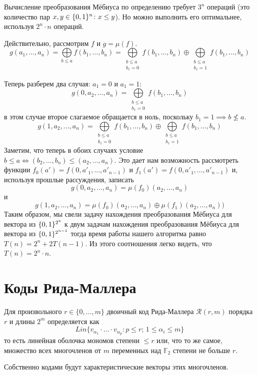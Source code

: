 Вычисление преобразования Мёбиуса по определению требует $3^n$ операций
(это количество пар $x, y \in \{0,1\}^n \colon x \le y$). Но можно выполнить
его оптимальнее, используя $2^n \cdot n$ операций.

Действительно, рассмотрим $f$ и $g = \mu(f)$. 
$$g(a_1, \ldots, a_n) = \bigoplus\limits_{b \le a} f(b_1, \ldots, b_n) = 
\bigoplus\limits_{\substack{b \le a \\ b_1 = 0}} f(b_1, \ldots, b_n) \oplus
\bigoplus\limits_{\substack{b \le a \\ b_1 = 1}} f(b_1, \ldots, b_n)$$

Теперь разберем два случая: $a_1 = 0$ и $a_1 = 1$:
$$g(0, a_2, \ldots, a_n) = \bigoplus\limits_{\substack{b \le a \\ b_1 = 0}} f(b_1, \ldots, b_n)$$
в этом случае второе слагаемое обращается в ноль, поскольку 
$b_1 = 1 \implies b \not\le a$.
$$g(1, a_2, \ldots, a_n) = 
\bigoplus\limits_{\substack{b \le a \\ b_1 = 0}} f(b_1, \ldots, b_n) \oplus
\bigoplus\limits_{\substack{b \le a \\ b_1 = 1}} f(b_1, \ldots, b_n)$$
Заметим, что теперь в обоих случаях условие 
$b \le a \iff (b_2, \ldots, b_n) \le (a_2, \ldots, a_n)$. Это дает нам
возможность рассмотреть функции $f_0 (a') = f(0, a'_1, \ldots, a'_{n-1})$
и $f_1(a') = f(0, a'_1, \ldots, a'_{n-1})$ и, используя прошлые рассуждения,
записать
$$g(0, a_2, \ldots, a_n) = \mu(f_0) (a_2, \ldots, a_n)$$
и 
$$g(1, a_2, \ldots, a_n) = \mu(f_0) (a_2, \ldots, a_n) \oplus
                           \mu(f_1) (a_2, \ldots, a_n))$$
Таким образом, мы свели задачу нахождения преобразования
Мёбиуса для вектора из $\{0,1\}^{2^n}$ к двум задачам нахождения преобразования
Мёбиуса для вектора из $\{0,1\}^{2^{n-1}}$ тогда время работы нашего
алгоритма равно $T(n) = 2^n + 2T(n-1)$. Из этого соотношения легко
видеть, что $T(n) = 2^n \cdot n$.      

\section{Коды Рида-Маллера}                    
                               

\begin{definition}
Для произвольного $r \in \{0, \ldots, m\}$ двоичный код Рида-Маллера $\mathscr{R}(r,m)$ 
порядка $r$ и длины $2^m$ определяется как 
    $$Lin \{v_{\alpha_1} \cdot \ldots \cdot v_{\alpha_p} \colon p \le r; \, 1 \le \alpha_i \le m\}$$
то есть линейная оболочка мономов степени $\le r$ или, что то же самое, множество всех многочленов от $m$ 
переменных над $\mathbb{F}_2$ степени не больше $r$.

Собственно кодами будут характеристические векторы этих многочленов.
\end{definition}

